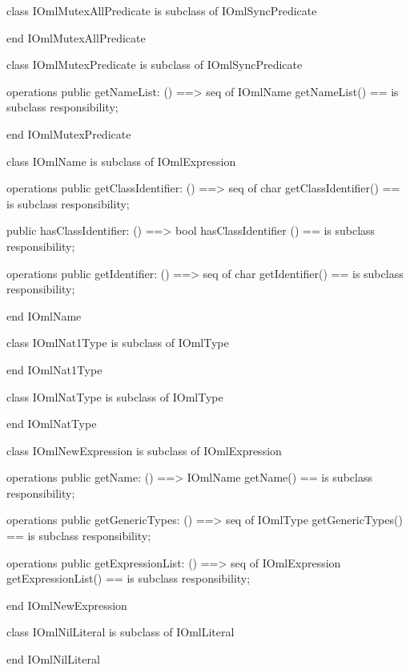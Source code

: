 \begin{vdm_al}
class IOmlMutexAllPredicate
 is subclass of IOmlSyncPredicate

end IOmlMutexAllPredicate
\end{vdm_al}

\begin{vdm_al}
class IOmlMutexPredicate
 is subclass of IOmlSyncPredicate

operations
  public getNameList: () ==> seq of IOmlName
  getNameList() == is subclass responsibility;

end IOmlMutexPredicate
\end{vdm_al}

\begin{vdm_al}
class IOmlName
 is subclass of IOmlExpression

operations
  public getClassIdentifier: () ==> seq of char
  getClassIdentifier() == is subclass responsibility;

  public hasClassIdentifier: () ==> bool
  hasClassIdentifier () == is subclass responsibility;

operations
  public getIdentifier: () ==> seq of char
  getIdentifier() == is subclass responsibility;

end IOmlName
\end{vdm_al}

\begin{vdm_al}
class IOmlNat1Type
 is subclass of IOmlType

end IOmlNat1Type
\end{vdm_al}

\begin{vdm_al}
class IOmlNatType
 is subclass of IOmlType

end IOmlNatType
\end{vdm_al}

\begin{vdm_al}
class IOmlNewExpression
 is subclass of IOmlExpression

operations
  public getName: () ==> IOmlName
  getName() == is subclass responsibility;

operations
  public getGenericTypes: () ==> seq of IOmlType
  getGenericTypes() == is subclass responsibility;

operations
  public getExpressionList: () ==> seq of IOmlExpression
  getExpressionList() == is subclass responsibility;

end IOmlNewExpression
\end{vdm_al}

\begin{vdm_al}
class IOmlNilLiteral
 is subclass of IOmlLiteral

end IOmlNilLiteral
\end{vdm_al}

